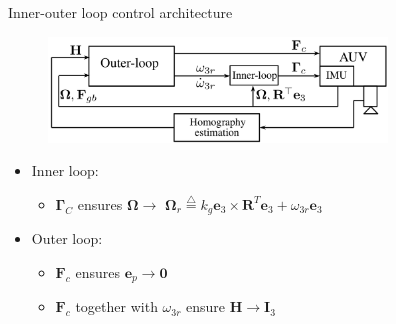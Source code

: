 \documentclass{beamer}
\begin{document}
\begin{frame}{Inner-outer loop control architecture}
\begin{figure}
	\includegraphics[width = 90mm]{Images/Block_diagram_2.png}
\end{figure}


\begin{itemize}
	\item Inner loop:
	\begin{itemize}
	
		\item $\mathbf{\Gamma}_C$ ensures  $ \mathbf{\Omega} \longrightarrow $ $ \mathbf{\Omega}_r \stackrel{\triangle}{=}  k_g \mathbf{e}_3 \times \mathbf{R}^{T} \mathbf{e}_3 + \omega_{3r} \mathbf{e}_3$ 
	\end{itemize} 
	\item Outer loop:
		\begin{itemize}
			\item $\mathbf{F}_c$ ensures $\mathbf{e}_p \longrightarrow \mathbf{0}$
			\item $\mathbf{F}_c$ together with $\omega_{3r}$ ensure $\mathbf{H} \longrightarrow \mathbf{I}_3$
		\end{itemize}
\end{itemize}
\end{frame}
\end{document}
